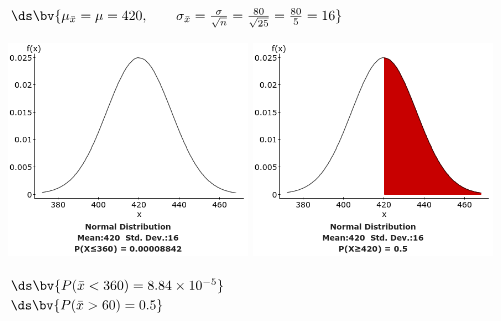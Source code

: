 \documentclass{article}
\begin{document}
\begin{flushleft}
\begin{enumalpha}
\medskip
{}\\
\medskip
$\ds\bv{\mu_{\bar x} = \mu = 420	, \qquad \sigma_{\bar x} = \frac{\sigma}{\sqrt n} = \frac {80}{\sqrt{25}} = \frac {80}5 = 16}$\\
\medskip
{\centering
\includegraphics[width=2.5in]{images/grp06_Q3_b_1} \qquad
\includegraphics[width=2.5in]{images/grp06_Q3_b_2}
\par}
$\ds\bv{P(\bar x < 360) = 8.84 \times 10^{-5}}$\\
\medskip
$\ds\bv{P(\bar x > 60) = 0.5}$

\end{enumalpha}


\end{flushleft}
\end{document}
